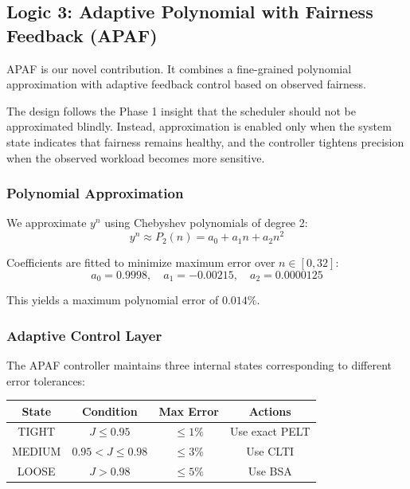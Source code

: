 \documentclass[conference]{IEEEtran}
\begin{document}
\subsection{Logic 3: Adaptive Polynomial with Fairness Feedback (APAF)}

APAF is our novel contribution. It combines a fine-grained polynomial approximation with adaptive feedback control based on observed fairness.

The design follows the Phase 1 insight that the scheduler should not be approximated blindly. Instead, approximation is enabled only when the system state indicates that fairness remains healthy, and the controller tightens precision when the observed workload becomes more sensitive.

\subsubsection{Polynomial Approximation}
We approximate $y^n$ using Chebyshev polynomials of degree 2:
\begin{equation}
y^n \approx P_2(n) = a_0 + a_1 n + a_2 n^2
\label{eq:apaf_poly}
\end{equation}

Coefficients are fitted to minimize maximum error over $n \in [0, 32]$:
\begin{equation}
a_0 = 0.9998, \quad a_1 = -0.00215, \quad a_2 = 0.0000125
\label{eq:apaf_coeff}
\end{equation}

This yields a maximum polynomial error of $0.014\%$.

\subsubsection{Adaptive Control Layer}

The APAF controller maintains three internal states corresponding to different error tolerances:

\begin{table}[h]
\centering
\begin{tabular}{|c|c|c|c|}
\hline
\textbf{State} & \textbf{Condition} & \textbf{Max Error} & \textbf{Actions} \\
\hline
TIGHT & $J \leq 0.95$ & $\leq 1\%$ & Use exact PELT \\
MEDIUM & $0.95 < J \leq 0.98$ & $\leq 3\%$ & Use CLTI \\
LOOSE & $J > 0.98$ & $\leq 5\%$ & Use BSA \\
\hline
\end{tabular}
\label{tab:apaf_states}
\end{table}
\end{document}
